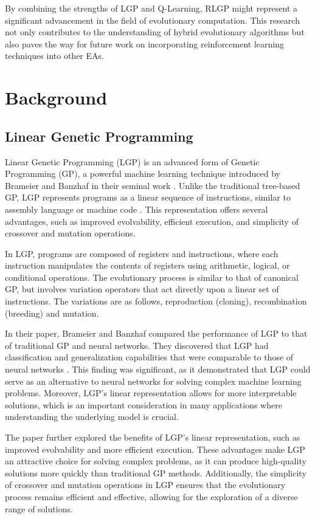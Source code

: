 \documentclass[12pt, final]{dalcsthesis}
\begin{document}
By combining the strengths of LGP and Q-Learning, RLGP might represent a significant advancement in the field of evolutionary computation. This research not only contributes to the understanding of hybrid evolutionary algorithms but also paves the way for future work on incorporating reinforcement learning techniques into other EAs.

\chapter{Background}
\section{Linear Genetic Programming}
Linear Genetic Programming (LGP) is an advanced form of Genetic Programming (GP), a powerful machine learning technique introduced by Brameier and Banzhaf in their seminal work \cite{brameier2001comparison}. Unlike the traditional tree-based GP, LGP represents programs as a linear sequence of instructions, similar to assembly language or machine code \cite{koza93}. This representation offers several advantages, such as improved evolvability, efficient execution, and simplicity of crossover and mutation operations.

In LGP, programs are composed of registers and instructions, where each instruction manipulates the contents of registers using arithmetic, logical, or conditional operations. The evolutionary process is similar to that of canonical GP, but involves variation operators that act directly upon a linear set of instructions. The variations are as follows, reproduction (cloning), recombination (breeding) and mutation.

In their paper, Brameier and Banzhaf compared the performance of LGP to that of traditional GP and neural networks. They discovered that LGP had classification and generalization capabilities that were comparable to those of neural networks \cite{brameier2001comparison}. This finding was significant, as it demonstrated that LGP could serve as an alternative to neural networks for solving complex machine learning problems. Moreover, LGP's linear representation allows for more interpretable solutions, which is an important consideration in many applications where understanding the underlying model is crucial.

The paper further explored the benefits of LGP's linear representation, such as improved evolvability and more efficient execution. These advantages make LGP an attractive choice for solving complex problems, as it can produce high-quality solutions more quickly than traditional GP methods. Additionally, the simplicity of crossover and mutation operations in LGP ensures that the evolutionary process remains efficient and effective, allowing for the exploration of a diverse range of solutions.
\end{document}
